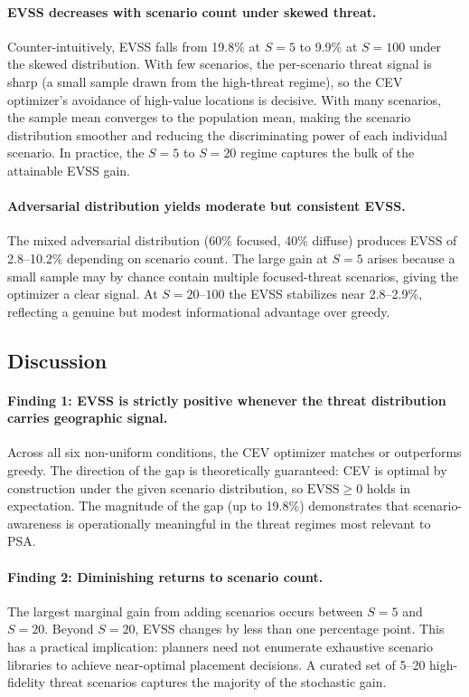 \documentclass[11pt]{article}
\begin{document}
\paragraph{EVSS decreases with scenario count under skewed threat.}
Counter-intuitively, EVSS falls from 19.8\% at $S = 5$ to 9.9\% at
$S = 100$ under the skewed distribution.  With few scenarios, the
per-scenario threat signal is sharp (a small sample drawn from the
high-threat regime), so the CEV optimizer's avoidance of high-value
locations is decisive.  With many scenarios, the sample mean converges
to the population mean, making the scenario distribution smoother and
reducing the discriminating power of each individual scenario.
In practice, the $S = 5$ to $S = 20$ regime captures the bulk of the
attainable EVSS gain.

\paragraph{Adversarial distribution yields moderate but consistent EVSS.}
The mixed adversarial distribution (60\% focused, 40\% diffuse) produces
EVSS of 2.8--10.2\% depending on scenario count.  The large gain at
$S = 5$ arises because a small sample may by chance contain multiple
focused-threat scenarios, giving the optimizer a clear signal.  At
$S = 20$--$100$ the EVSS stabilizes near 2.8--2.9\%, reflecting
a genuine but modest informational advantage over greedy.

\subsection{Discussion}
\label{sec:exp2:discussion}

\paragraph{Finding 1: EVSS is strictly positive whenever the threat
distribution carries geographic signal.}
Across all six non-uniform conditions, the CEV optimizer matches or
outperforms greedy.  The direction of the gap is theoretically guaranteed:
CEV is optimal by construction under the given scenario distribution, so
$\mathrm{EVSS} \geq 0$ holds in expectation.  The magnitude of the gap
(up to 19.8\%) demonstrates that scenario-awareness is operationally
meaningful in the threat regimes most relevant to PSA.

\paragraph{Finding 2: Diminishing returns to scenario count.}
The largest marginal gain from adding scenarios occurs between $S = 5$
and $S = 20$.  Beyond $S = 20$, EVSS changes by less than one percentage
point.  This has a practical implication: planners need not enumerate
exhaustive scenario libraries to achieve near-optimal placement decisions.
A curated set of 5--20 high-fidelity threat scenarios captures the
majority of the stochastic gain.
\end{document}
